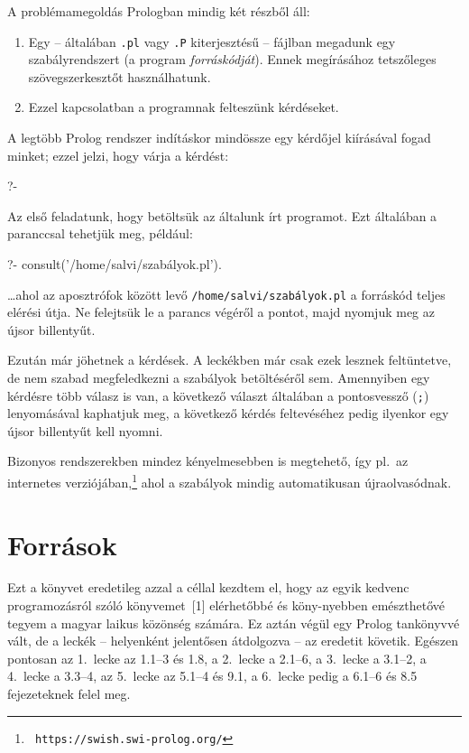 A problémamegoldás Prologban mindig két részből áll:
\begin{enumerate}
\item Egy -- általában {\tt .pl} vagy {\tt .P} kiterjesztésű --
  fájlban megadunk egy szabályrendszert (a program
  \emph{forráskódját}). Ennek megírásához tetszőleges
  szövegszerkesztőt használhatunk.
\item Ezzel kapcsolatban a programnak felteszünk kérdéseket.
\end{enumerate}
A legtöbb Prolog rendszer indításkor mindössze egy kérdőjel kiírásával
fogad minket; ezzel jelzi, hogy várja a kérdést:
\begin{query}
?-
\end{query}  
Az első feladatunk, hogy betöltsük az általunk írt programot. Ezt
általában a  paranccsal tehetjük meg, például:
\begin{query}
?- consult('/home/salvi/szabályok.pl').
\end{query}
\dots ahol az aposztrófok között levő {\tt /home/salvi/szabályok.pl} a
forráskód teljes elérési útja. Ne felejtsük le a parancs végéről a
pontot, majd nyomjuk meg az újsor billentyűt.

Ezután már jöhetnek a kérdések. A leckékben már csak ezek lesznek
feltüntetve, de nem szabad megfeledkezni a szabályok betöltéséről sem.
Amennyiben egy kérdésre több válasz is van, a következő választ
általában a pontosvessző ({\tt ;}) lenyomásával kaphatjuk meg, a
következő kérdés feltevéséhez pedig ilyenkor egy újsor billentyűt kell
nyomni.

Bizonyos rendszerekben mindez kényelmesebben is megtehető, így pl.~az
 internetes  verziójában,\footnote{\tt
https://swish.swi-prolog.org/} ahol a szabályok mindig automatikusan
újraolvasódnak.

\section*{Források}
Ezt a könyvet eredetileg azzal a céllal kezdtem el, hogy az egyik
kedvenc programozásról szóló könyvemet~[1] elérhetőbbé és köny-nyebben
emészthetővé tegyem a magyar laikus közönség számára. Ez aztán végül
egy Prolog tankönyvvé vált, de a leckék -- helyenként jelentősen
átdolgozva -- az eredetit követik. Egészen pontosan az 1.~lecke az
1.1--3 és 1.8, a 2.~lecke a 2.1--6, a 3.~lecke a 3.1--2, a 4.~lecke a
3.3--4, az 5.~lecke az 5.1--4 és 9.1, a 6.~lecke pedig a 6.1--6 és 8.5
fejezeteknek felel meg.

